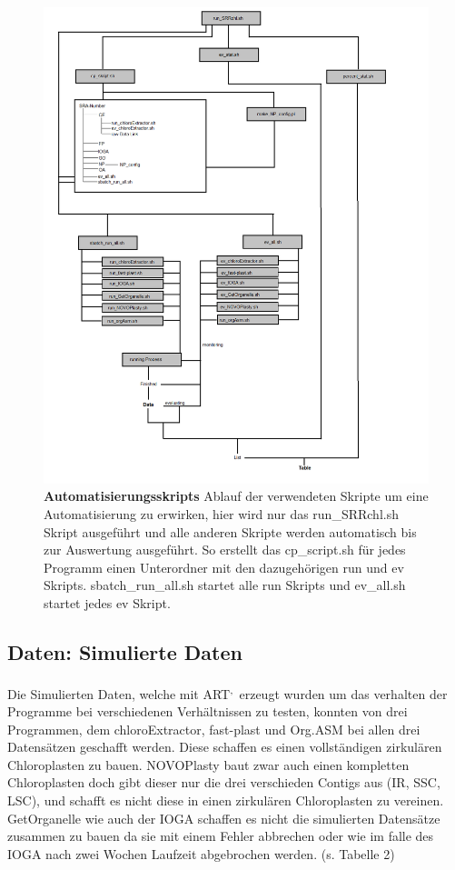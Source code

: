 \documentclass{scrartcl}
\begin{document}
\begin{figure}
\includegraphics[width=.9\linewidth]{./Diagram_Master.png}
\caption[Automatisierungsskripts]{\textbf{Automatisierungsskripts} Ablauf der verwendeten Skripte um eine Automatisierung zu erwirken, hier wird nur das run\_SRRchl.sh Skript ausgeführt und alle anderen Skripte werden automatisch bis zur Auswertung ausgeführt. So erstellt das cp\_script.sh für jedes Programm einen Unterordner mit den dazugehörigen run und ev Skripts. sbatch\_run\_all.sh startet alle run Skripts und ev\_all.sh startet jedes ev Skript.}
\end{figure}


\subsection{Daten: Simulierte Daten}
\label{sec-4-2}
Die Simulierten Daten, welche mit ART\footnotemark[48]{}\textsuperscript{,}\,\footnotemark[49]{} erzeugt wurden um das verhalten der Programme bei verschiedenen Verhältnissen zu testen, konnten von drei Programmen, dem chloroExtractor, fast-plast und Org.ASM 
bei allen drei Datensätzen geschafft werden. Diese schaffen es einen vollständigen zirkulären Chloroplasten zu bauen. NOVOPlasty baut zwar auch einen kompletten Chloroplasten doch gibt dieser 
nur die drei verschieden Contigs aus (IR, SSC, LSC), und schafft es nicht diese in einen zirkulären Chloroplasten zu vereinen. GetOrganelle wie auch der IOGA schaffen es nicht die
simulierten Datensätze zusammen zu bauen da sie mit einem Fehler abbrechen oder wie im falle des IOGA nach zwei Wochen Laufzeit abgebrochen werden. (s. Tabelle 2) 
\end{document}
